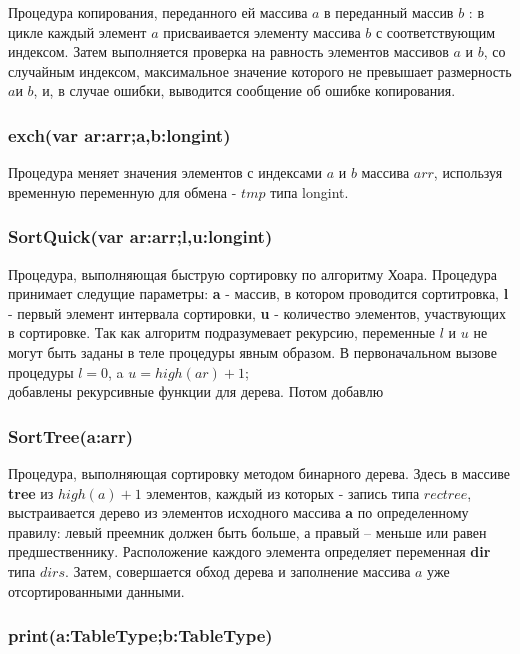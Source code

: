 \documentclass[a4paper,11pt]{article}
\begin{document}
Процедура копирования, переданного ей массива $a$ в переданный массив $b$ : в цикле каждый элемент $a$ присваивается 
элементу массива $b$ с соответствующим индексом. Затем выполняется проверка на равность элементов массивов $a$ и $b$,
со случайным индексом, максимальное значение которого не превышает размерность $a$и $b$, и, в случае ошибки, выводится 
сообщение об ошибке копирования.
\\
\begin{center}
\subsubsection{exch(var ar:arr;a,b:longint)}
\end{center}

Процедура меняет значения элементов с индексами $a$ и $b$ массива $arr$, используя временную переменную для обмена - $tmp$ 
типа longint.
\\
\begin{center}
\subsubsection{SortQuick(var ar:arr;l,u:longint)}
\end{center}

Процедура, выполняющая быструю сортировку по алгоритму Хоара. Процедура принимает следущие параметры: {\bf a} - массив, в котором проводится сортитровка,
{\bf l} - первый элемент интервала сортировки, {\bf u} - количество элементов, участвующих в сортировке. Так как алгоритм подразумевает рекурсию,
переменные $l$ и $u$ не могут быть заданы в теле процедуры явным образом. В первоначальном вызове процедуры $l=0$, a 
$u=high(ar)+1$;
\\

{\large{} добавлены рекурсивные функции для дерева. Потом добавлю}

\begin{center}
\subsubsection{SortTree(a:arr)}
\end{center}

Процедура, выполняющая сортировку методом бинарного дерева. Здесь в массиве {\bf tree} из  $high(a)+1$  элементов, каждый из которых - запись типа $rectree$, выстраивается дерево из элементов исходного массива {\bf a} по определенному правилу: левый преемник должен быть больше, а правый -- меньше или равен предшественнику. Расположение каждого элемента определяет 
переменная {\bf dir} типа $dirs$. Затем, совершается обход дерева и заполнение массива $a$ уже отсортированными данными.
\\
\begin{center}
\subsubsection{print(a:TableType;b:TableType)}
\end{center}
\end{document}
